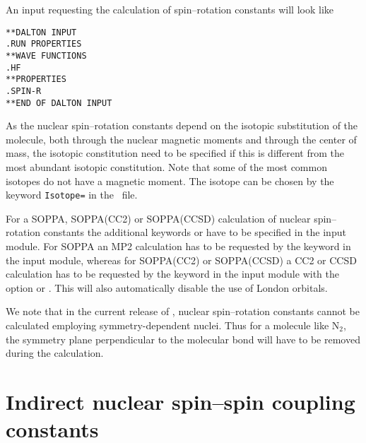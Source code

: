 An input requesting the calculation of spin--rotation constants will
look like

\begin{verbatim}
**DALTON INPUT
.RUN PROPERTIES
**WAVE FUNCTIONS
.HF
**PROPERTIES
.SPIN-R
**END OF DALTON INPUT
\end{verbatim}

As the nuclear spin--rotation constants
depend on the isotopic substitution of
the molecule, both through the nuclear magnetic moments and through the
center of mass, the isotopic constitution need to be specified if this
is different  from the most abundant isotopic constitution. Note that
some of the most common isotopes do not have a magnetic moment. The isotope can be chosen by the keyword \verb|Isotope=| in the \mol\ file.

For a SOPPA, SOPPA(CC2) or
SOPPA(CCSD) calculation of nuclear spin--rotation
constants the additional keywords  or  have
to be specified in the  input module. For SOPPA an MP2
calculation has to be requested by the keyword  in the
 input module, whereas for SOPPA(CC2) or
SOPPA(CCSD) a CC2 or CCSD calculation has to be requested by the
keyword  in the  input module with the  option
 or . This will also automatically disable
the use of London orbitals.

We note that in the current release of \dalton, nuclear spin--rotation
constants cannot be calculated employing symmetry-dependent nuclei.
Thus for a molecule like N$_2$, the symmetry plane perpendicular to the
molecular bond will have to be removed during the calculation.

\section{Indirect nuclear spin--spin coupling
constants}\label{sec:spinspin}

